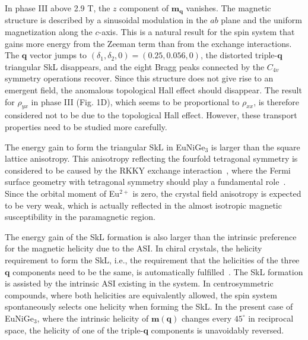 \documentclass[aps,prb,reprint,superscriptaddress,amsmath,amssymb]{revtex4-2}
\begin{document}
In phase III above 2.9 T, the $z$ component of $\bm{m}_{\bm{q}}$ vanishes. The magnetic structure is described by a sinusoidal modulation in the $ab$ plane and the uniform magnetization along the $c$-axis. This is a natural result for the spin system that gains more energy from the Zeeman term than from the exchange interactions. 
The $\bm{q}$ vector jumps to $(\delta_1, \delta_2, 0)=(0.25, 0.056, 0)$, the distorted triple-$\bm{q}$ triangular SkL disappears, and the eight Bragg peaks connected by the $C_{4v}$ symmetry operations recover. 
Since this structure does not give rise to an emergent field, the anomalous topological Hall effect should disappear. The result for $\rho_{yx}$ in phase III (Fig. 1D), which seems to be proportional to $\rho_{xx}$, is therefore considered not to be due to the topological Hall effect. 
However, these transport properties need to be studied more carefully. 

The energy gain to form the triangular SkL in EuNiGe$_3$ is larger than the square lattice anisotropy. 
This anisotropy reflecting the fourfold tetragonal symmetry is considered to be caused by the RKKY exchange interaction~\cite{Hayami17,Yambe22}, where the Fermi surface geometry with tetragonal symmetry should play a fundamental role~\cite{Kakihana17}. 
Since the orbital moment of Eu$^{2+}$ is zero, the crystal field anisotropy is expected to be very weak, which is actually reflected in the almost isotropic magnetic susceptibility in the paramagnetic region. 

The energy gain of the SkL formation is also larger than the intrinsic preference for the magnetic helicity due to the ASI. 
In chiral crystals, the helicity requirement to form the SkL, i.e., the requirement that the helicities of the three $\bm{q}$ components need to be the same, is automatically fulfilled~\cite{Muhlbauer09,Yu10}. The SkL formation is assisted by the intrinsic ASI existing in the system. 
In centrosymmetric compounds, where both helicities are equivalently allowed, the spin system spontaneously selects one helicity when forming the SkL. 
In the present case of EuNiGe$_3$, where the intrinsic helicity of $\bm{m}(\bm{q})$ changes every $45^{\circ}$ in reciprocal space, the helicity of one of the triple-$\bm{q}$ components is unavoidably reversed. 
\end{document}
